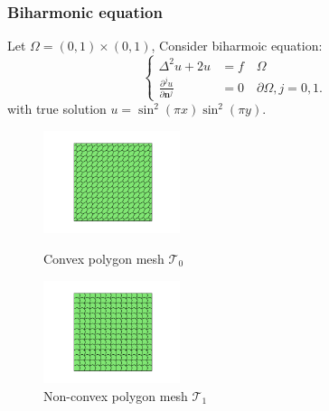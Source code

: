 \documentclass[notheorems,serif]{beamer}
\begin{document}
\begin{CJK}{UTF8}{gkai}
\begin{frame}
\end{frame}

\begin{frame}
  \frametitle{Biharmonic equation}
  Let $\Omega = (0, 1)\times(0, 1)$, Consider biharmoic equation:
  $$
  \left\{
  \begin{aligned} 
      \Delta^2 u + 2u & = f \quad \Omega\\
      \frac{\partial^j u}{\partial \boldsymbol{n}^j} & = 0 \quad \partial\Omega,
      j = 0, 1.
  \end{aligned}
  \right.
  $$
  with true solution $u = \sin^2(\pi x)\sin^2(\pi y)$.

\begin{figure}[htb p]
\centering
\begin{minipage}[t]{0.49\linewidth}
\centering
\includegraphics[width=4cm]{../figures/convex.pdf}
\caption{Convex polygon mesh $\mathcal T_0$}
\end{minipage}%
\begin{minipage}[t]{0.49\linewidth}
\centering
\includegraphics[width=4cm]{../figures/nonconvex.pdf}
\caption{Non-convex polygon mesh $\mathcal T_1$}
\end{minipage}%
\centering
\end{figure}
\end{frame}


\end{CJK}
\end{document}
